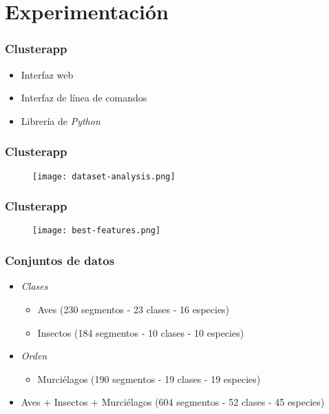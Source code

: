 \section{Experimentación}\label{sec:results}

\begin{frame}
    \frametitle{Clusterapp}

    \begin{itemize}
        \item<2-> Interfaz web
        \item<3-> Interfaz de línea de comandos
        \item<4-> Librería de \textit{Python}
    \end{itemize}

\end{frame}

\begin{frame}
    \frametitle{Clusterapp}

    \begin{figure}[!h]
        \centering
        \texttt{[image: dataset-analysis.png]}
    \end{figure}

\end{frame}

\begin{frame}
    \frametitle{Clusterapp}

    \begin{figure}[!h]
        \centering
        \texttt{[image: best-features.png]}
    \end{figure}

\end{frame}

\begin{frame}
    \frametitle{Conjuntos de datos}

    \begin{itemize}
        \item<2-> \textit{Clases}
        \begin{itemize}
            \item<3-> Aves (230 segmentos - 23 clases - 16 especies)
            \item<4-> Insectos (184 segmentos - 10 clases - 10 especies)
        \end{itemize}
        \item<5-> \textit{Orden}
        \begin{itemize}
            \item<6-> Murciélagos (190 segmentos - 19 clases - 19 especies)
        \end{itemize}
        \item<7-> Aves + Insectos + Murciélagos (604 segmentos - 52 clases - 45 especies)
    \end{itemize}

\end{frame}

